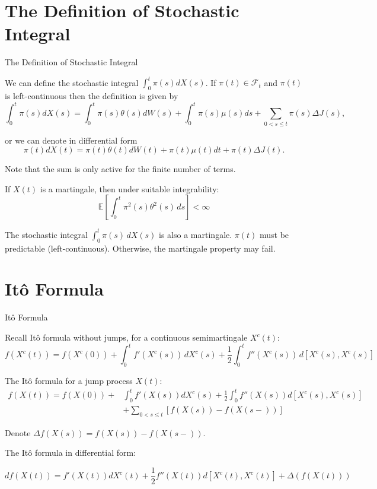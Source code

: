 \documentclass{beamer}
\begin{document}
\section{The Definition of Stochastic Integral}
\begin{frame}{The Definition of Stochastic Integral}

    {\footnotesize \footnotesize
    \par We can define the stochastic integral \(\int_0^t \pi(s) dX(s)\). If \(\pi(t) \in \mathcal{F}_t\) and \(\pi(t)\) is left-continuous then the definition is given by
    \[
    \int_0^t \pi(s) dX(s) = \int_0^t \pi(s) \theta(s) dW(s) + \int_0^t \pi(s) \mu(s) ds + \sum_{0 < s \leq t} \pi(s) \Delta J(s),
    \]
    \par or we can denote in differential form
    \[
    \pi(t) dX(t) = \pi(t) \theta(t) dW(t) + \pi(t) \mu(t) dt + \pi(t) \Delta J(t).
    \]

    \par  \pause Note that the sum is only active for the finite number of terms.
    \vspace{1em}
    \par If \( X(t) \) is a martingale, then under suitable integrability:
    \[
    \mathbb{E} \left[ \int_{0}^{t} \pi^2(s) \theta^2(s) \, ds \right] < \infty
    \]
    \par The stochastic integral \(\int_{0}^{t} \pi(s) \, dX(s)\) is also a martingale. \( \pi(t) \) 
    must be predictable (left-continuous). Otherwise, the martingale property may fail.

    }
    
\end{frame}

\section{Itô Formula}
 \begin{frame}{Itô Formula}

    {\footnotesize \footnotesize
    \par Recall Itô formula without jumps, for a continuous semimartingale \( X^c(t) \):
    \[
    f(X^c(t)) = f(X^c(0)) + \int_0^t f'(X^c(s)) \, dX^c(s) + \frac{1}{2} \int_0^t f''(X^c(s)) \, d[X^c(s), X^c(s)]
    \]
    \par  \pause The Itô formula for a jump process \( X(t) \):
    \begin{align*}
        f(X(t)) = f(X(0)) + &\int_{0}^{t} f'(X(s))dX^{c}(s) 
        + \frac{1}{2}\int_{0}^{t} f''(X(s))d[X^{c}(s), X^{c}(s)]\\
        & + \sum_{0<s\leq t}[f(X(s)) - f(X(s-))]
    \end{align*}
    \par Denote $\Delta f(X(s)) = f(X(s)) - f(X(s-))$.
    \vspace{1em}
    \par  \pause The Itô formula in differential form: 

    \[
    df(X(t)) = f'(X(t))dX^{c}(t) + \frac{1}{2}f''(X(t))d[X^{c}(t), X^{c}(t)] + \Delta(f(X(t)))
    \]
    }
    
\end{frame}
\end{document}
